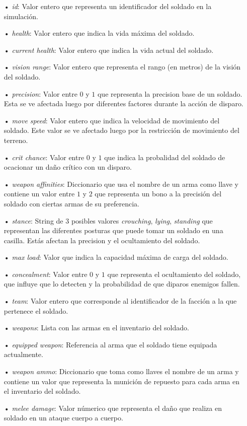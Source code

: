 \documentclass[twoside]{article}
\begin{document}
		\begin{itemize}
			\item[•] \emph{id}: Valor entero que representa un identificador del soldado en la simulaci\'on.
			\item[•] \emph{health}: Valor entero que indica la vida m\'axima del soldado.
			\item[•] \emph{current health}: Valor entero que indica la vida actual del soldado.
			\item[•] \emph{vision range}: Valor entero que representa el rango (en metros) de la visi\'on del soldado.
			\item[•] \emph{precision}: Valor entre $0$ y $1$ que representa la precision base de un soldado. Esta se ve afectada luego por diferentes factores durante la acci\'on de disparo.
			\item[•] \emph{move speed}: Valor entero que indica la velocidad de movimiento del soldado. Este valor se ve afectado luego por la restricci\'on de movimiento del terreno.
			\item[•] \emph{crit chance}: Valor entre $0$ y $1$ que indica la probalidad del soldado de ocacionar un da\~no cr\'itico con un disparo.
			\item[•] \emph{weapon affinities}: Diccionario que usa el nombre de un arma como llave y contiene un valor entre $1$ y $2$ que representa un bono a la precisi\'on del soldado con ciertas armas de su preferencia.
			\item[•] \emph{stance}: String de $3$ posibles valores \emph{crouching}, \emph{lying}, \emph{standing} que representan las diferentes posturas que puede tomar un soldado en una casilla. Est\'as afectan la precision y el ocultamiento del soldado.
			\item[•] \emph{max load}: Valor que indica la capacidad m\'axima de carga del soldado.
			\item[•] \emph{concealment}: Valor entre $0$ y $1$ que representa el ocultamiento del soldado, que influye que lo detecten y la probabilidad de que diparos enemigos fallen.
			\item[•] \emph{team}: Valor entero que corresponde al identificador de la facci\'on a la que pertenece el soldado.
			\item[•] \emph{weapons}: Lista con las armas en el inventario del soldado.
			\item[•]\emph{equipped weapon}: Referencia al arma que el soldado tiene equipada actualmente.
			\item[•] \emph{weapon ammo}: Diccionario que toma como llaves el nombre de un arma y contiene un valor que representa la munici\'on de repuesto para cada arma en el inventario del soldado.
			\item[•] \emph{melee damage}: Valor n\'umerico que representa el da\~no que realiza en soldado en un ataque cuerpo a cuerpo.
		\end{itemize}
		
\end{document}

